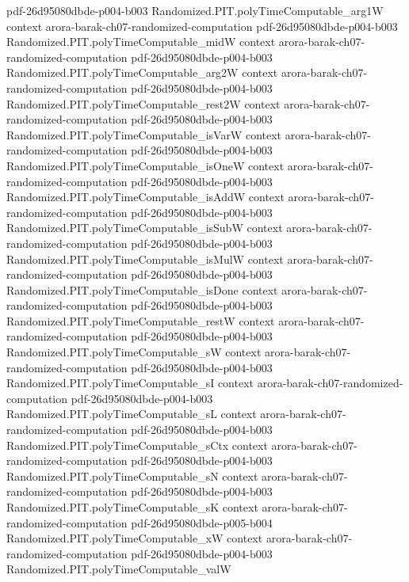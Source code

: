 \begin{theorem}
  {pdf-26d95080dbde-p004-b003}
\proofstep
  {Randomized.PIT.polyTimeComputable_arg1W}
  {context}
  {arora-barak-ch07-randomized-computation}
  {pdf-26d95080dbde-p004-b003}
\proofstep
  {Randomized.PIT.polyTimeComputable_midW}
  {context}
  {arora-barak-ch07-randomized-computation}
  {pdf-26d95080dbde-p004-b003}
\proofstep
  {Randomized.PIT.polyTimeComputable_arg2W}
  {context}
  {arora-barak-ch07-randomized-computation}
  {pdf-26d95080dbde-p004-b003}
\proofstep
  {Randomized.PIT.polyTimeComputable_rest2W}
  {context}
  {arora-barak-ch07-randomized-computation}
  {pdf-26d95080dbde-p004-b003}
\proofstep
  {Randomized.PIT.polyTimeComputable_isVarW}
  {context}
  {arora-barak-ch07-randomized-computation}
  {pdf-26d95080dbde-p004-b003}
\proofstep
  {Randomized.PIT.polyTimeComputable_isOneW}
  {context}
  {arora-barak-ch07-randomized-computation}
  {pdf-26d95080dbde-p004-b003}
\proofstep
  {Randomized.PIT.polyTimeComputable_isAddW}
  {context}
  {arora-barak-ch07-randomized-computation}
  {pdf-26d95080dbde-p004-b003}
\proofstep
  {Randomized.PIT.polyTimeComputable_isSubW}
  {context}
  {arora-barak-ch07-randomized-computation}
  {pdf-26d95080dbde-p004-b003}
\proofstep
  {Randomized.PIT.polyTimeComputable_isMulW}
  {context}
  {arora-barak-ch07-randomized-computation}
  {pdf-26d95080dbde-p004-b003}
\proofstep
  {Randomized.PIT.polyTimeComputable_isDone}
  {context}
  {arora-barak-ch07-randomized-computation}
  {pdf-26d95080dbde-p004-b003}
\proofstep
  {Randomized.PIT.polyTimeComputable_restW}
  {context}
  {arora-barak-ch07-randomized-computation}
  {pdf-26d95080dbde-p004-b003}
\proofstep
  {Randomized.PIT.polyTimeComputable_sW}
  {context}
  {arora-barak-ch07-randomized-computation}
  {pdf-26d95080dbde-p004-b003}
\proofstep
  {Randomized.PIT.polyTimeComputable_sI}
  {context}
  {arora-barak-ch07-randomized-computation}
  {pdf-26d95080dbde-p004-b003}
\proofstep
  {Randomized.PIT.polyTimeComputable_sL}
  {context}
  {arora-barak-ch07-randomized-computation}
  {pdf-26d95080dbde-p004-b003}
\proofstep
  {Randomized.PIT.polyTimeComputable_sCtx}
  {context}
  {arora-barak-ch07-randomized-computation}
  {pdf-26d95080dbde-p004-b003}
\proofstep
  {Randomized.PIT.polyTimeComputable_sN}
  {context}
  {arora-barak-ch07-randomized-computation}
  {pdf-26d95080dbde-p004-b003}
\proofstep
  {Randomized.PIT.polyTimeComputable_sK}
  {context}
  {arora-barak-ch07-randomized-computation}
  {pdf-26d95080dbde-p005-b004}
\proofstep
  {Randomized.PIT.polyTimeComputable_xW}
  {context}
  {arora-barak-ch07-randomized-computation}
  {pdf-26d95080dbde-p004-b003}
\proofstep
  {Randomized.PIT.polyTimeComputable_valW}

\end{theorem}
